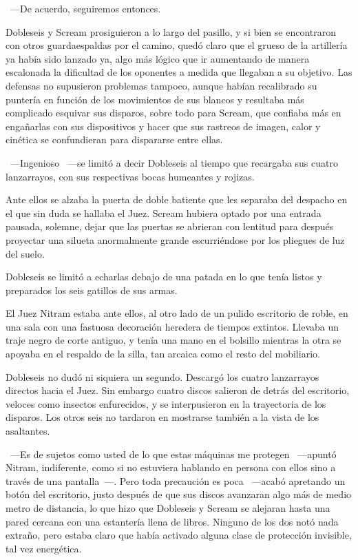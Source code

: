 ~---De acuerdo, seguiremos entonces.

Dobleseis y Scream prosiguieron a lo largo del pasillo, y si bien se encontraron con otros guardaespaldas por el camino, quedó claro que el grueso de la artillería ya había sido lanzado ya, algo más lógico que ir aumentando de manera escalonada la dificultad de los oponentes a medida que llegaban a su objetivo. Las defensas no supusieron problemas tampoco, aunque habían recalibrado su puntería en función de los movimientos de sus blancos y resultaba más complicado esquivar sus disparos, sobre todo para Scream, que confiaba más en engañarlas con sus dispositivos y hacer que sus rastreos de imagen, calor y cinética se confundieran para dispararse entre ellas.

~---Ingenioso ~---se limitó a decir Dobleseis al tiempo que recargaba sus cuatro lanzarrayos, con sus respectivas bocas humeantes y rojizas.

Ante ellos se alzaba la puerta de doble batiente que les separaba del despacho en el que sin duda se hallaba el Juez. Scream hubiera optado por una entrada pausada, solemne, dejar que las puertas se abrieran con lentitud para después proyectar una silueta anormalmente grande escurriéndose por los pliegues de luz del suelo.

Dobleseis se limitó a echarlas debajo de una patada en lo que tenía listos y preparados los seis gatillos de sus armas.

El Juez Nitram estaba ante ellos, al otro lado de un pulido escritorio de roble, en una sala con una fastuosa decoración heredera de tiempos extintos. Llevaba un traje negro de corte antiguo, y tenía una mano en el bolsillo mientras la otra se apoyaba en el respaldo de la silla, tan arcaica como el resto del mobiliario.

Dobleseis no dudó ni siquiera un segundo. Descargó los cuatro lanzarrayos directos hacia el Juez. Sin embargo cuatro discos salieron de detrás del escritorio, veloces como insectos enfurecidos, y se interpusieron en la trayectoria de los disparos. Los otros seis no tardaron en mostrarse también a la vista de los asaltantes.

~---Es de sujetos como usted de lo que estas máquinas me protegen ~---apuntó Nitram, indiferente, como si no estuviera hablando en persona con ellos sino a través de una pantalla~---. Pero toda precaución es poca ~---acabó apretando un botón del escritorio, justo después de que sus discos avanzaran algo más de medio metro de distancia, lo que hizo que Dobleseis y Scream se alejaran hasta una pared cercana con una estantería llena de libros. Ninguno de los dos notó nada extraño, pero estaba claro que había activado alguna clase de protección invisible, tal vez energética.

